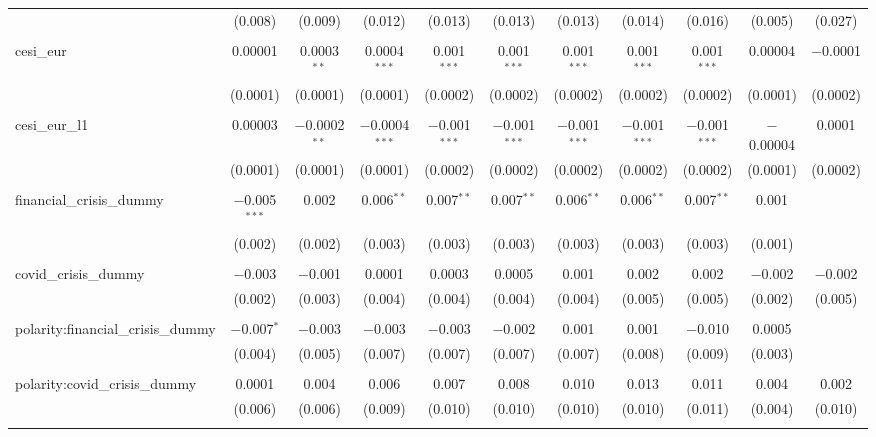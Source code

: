 \begin{table}[!htbp]
\begin{tabular}{@{\extracolsep{5pt}}lcccccccccc}
  & (0.008) & (0.009) & (0.012) & (0.013) & (0.013) & (0.013) & (0.014) & (0.016) & (0.005) & (0.027) \\ 
  & & & & & & & & & & \\ 
 cesi\_eur & 0.00001 & 0.0003$^{**}$ & 0.0004$^{***}$ & 0.001$^{***}$ & 0.001$^{***}$ & 0.001$^{***}$ & 0.001$^{***}$ & 0.001$^{***}$ & 0.00004 & $-$0.0001 \\ 
  & (0.0001) & (0.0001) & (0.0001) & (0.0002) & (0.0002) & (0.0002) & (0.0002) & (0.0002) & (0.0001) & (0.0002) \\ 
  & & & & & & & & & & \\ 
 cesi\_eur\_l1 & 0.00003 & $-$0.0002$^{**}$ & $-$0.0004$^{***}$ & $-$0.001$^{***}$ & $-$0.001$^{***}$ & $-$0.001$^{***}$ & $-$0.001$^{***}$ & $-$0.001$^{***}$ & $-$0.00004 & 0.0001 \\ 
  & (0.0001) & (0.0001) & (0.0001) & (0.0002) & (0.0002) & (0.0002) & (0.0002) & (0.0002) & (0.0001) & (0.0002) \\ 
  & & & & & & & & & & \\ 
 financial\_crisis\_dummy & $-$0.005$^{***}$ & 0.002 & 0.006$^{**}$ & 0.007$^{**}$ & 0.007$^{**}$ & 0.006$^{**}$ & 0.006$^{**}$ & 0.007$^{**}$ & 0.001 &  \\ 
  & (0.002) & (0.002) & (0.003) & (0.003) & (0.003) & (0.003) & (0.003) & (0.003) & (0.001) &  \\ 
  & & & & & & & & & & \\ 
 covid\_crisis\_dummy & $-$0.003 & $-$0.001 & 0.0001 & 0.0003 & 0.0005 & 0.001 & 0.002 & 0.002 & $-$0.002 & $-$0.002 \\ 
  & (0.002) & (0.003) & (0.004) & (0.004) & (0.004) & (0.004) & (0.005) & (0.005) & (0.002) & (0.005) \\ 
  & & & & & & & & & & \\ 
 polarity:financial\_crisis\_dummy & $-$0.007$^{*}$ & $-$0.003 & $-$0.003 & $-$0.003 & $-$0.002 & 0.001 & 0.001 & $-$0.010 & 0.0005 &  \\ 
  & (0.004) & (0.005) & (0.007) & (0.007) & (0.007) & (0.007) & (0.008) & (0.009) & (0.003) &  \\ 
  & & & & & & & & & & \\ 
 polarity:covid\_crisis\_dummy & 0.0001 & 0.004 & 0.006 & 0.007 & 0.008 & 0.010 & 0.013 & 0.011 & 0.004 & 0.002 \\ 
  & (0.006) & (0.006) & (0.009) & (0.010) & (0.010) & (0.010) & (0.010) & (0.011) & (0.004) & (0.010) \\ 
  & & & & & & & & & & \\ 

\end{tabular}
\end{table}
